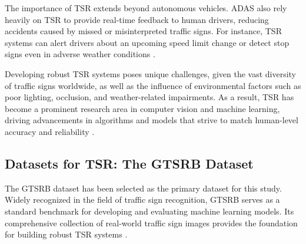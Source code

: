 The importance of TSR extends beyond autonomous vehicles. \ac{ADAS} also rely heavily 
on TSR to provide real-time feedback to human drivers, reducing accidents caused by missed or misinterpreted traffic 
signs. For instance, TSR systems can alert drivers about an upcoming speed limit change or detect stop signs even in 
adverse weather conditions \cite{Zhang2022}. 

Developing robust TSR systems poses unique challenges, given the vast diversity of traffic signs worldwide, as well 
as the influence of environmental factors such as poor lighting, occlusion, and weather-related impairments. As a result, 
TSR has become a prominent research area in computer vision and machine learning, driving advancements in algorithms and
 models that strive to match human-level accuracy and reliability \cite{cite-key2}.

 \subsection{Datasets for TSR: The GTSRB Dataset}

 The \ac{GTSRB} dataset has been selected as the primary dataset for this study.
  Widely recognized in the field of traffic sign recognition, GTSRB serves as a standard benchmark for developing and evaluating
   machine learning models. Its comprehensive collection of real-world traffic sign images provides the foundation for building
    robust TSR systems \cite{STALLKAMP2012323}.



